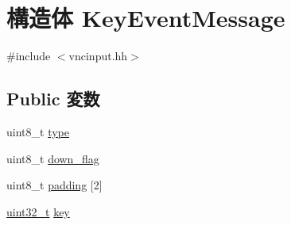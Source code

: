 \hypertarget{structVncInput_1_1KeyEventMessage}{
\section{構造体 KeyEventMessage}
\label{structVncInput_1_1KeyEventMessage}
}


{\ttfamily \#include $<$vncinput.hh$>$}\subsection*{Public 変数}
\begin{DoxyCompactItemize}
\item 
uint8\_\-t \hyperlink{structVncInput_1_1KeyEventMessage_a1d127017fb298b889f4ba24752d08b8e}{type}
\item 
uint8\_\-t \hyperlink{structVncInput_1_1KeyEventMessage_a728d39583ca6e83a2a487f0639c4231e}{down\_\-flag}
\item 
uint8\_\-t \hyperlink{structVncInput_1_1KeyEventMessage_adc9958438bc5e8eb9b9b9ade76e37e79}{padding} \mbox{[}2\mbox{]}
\item 
\hyperlink{Type_8hh_a435d1572bf3f880d55459d9805097f62}{uint32\_\-t} \hyperlink{structVncInput_1_1KeyEventMessage_a6d4ec8e4f3148d51041635da9986c3fa}{key}
\end{DoxyCompactItemize}



